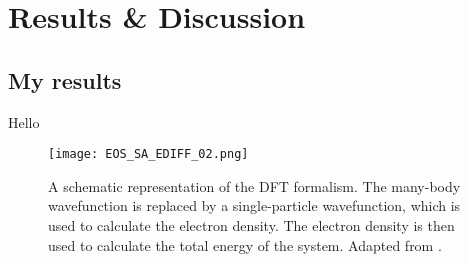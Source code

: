 \chapter{Results \& Discussion}
\label{Chapter4}

\section{My results}
Hello
\begin{figure}[H]
    \centering
    \texttt{[image: EOS\_SA\_EDIFF\_02.png]}
    \caption{A schematic representation of the DFT formalism. The many-body wavefunction is replaced by a single-particle wavefunction, which is used to calculate the electron density. The electron density is then used to calculate the total energy of the system. Adapted from \supercite{giustino2014materials}.}
    \label{fig:dft}
\end{figure}
